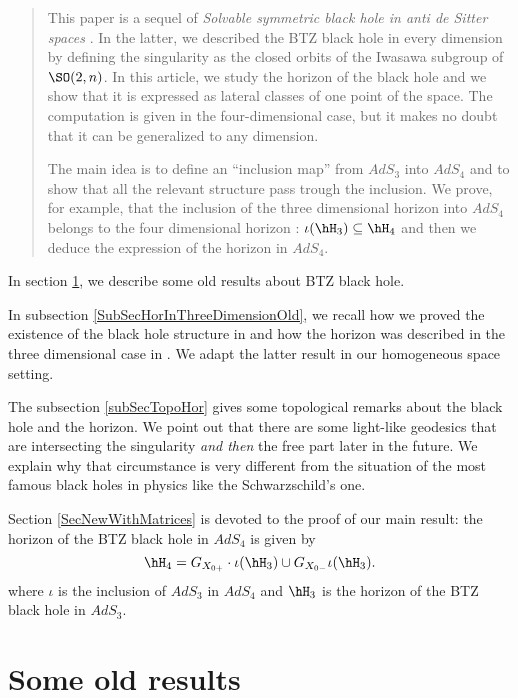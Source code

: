 \begin{abstract}
	This paper is a sequel of \emph{Solvable symmetric black hole in anti de Sitter spaces} \cite{lcTNAdS}. In the latter, we described the BTZ black hole in every dimension by defining the singularity as the closed orbits of the Iwasawa subgroup of $\SO(2,n)$. In this article, we study the horizon of the black hole and we show that it is expressed as lateral classes of one point of the space. The computation is given in the four-dimensional case, but it makes no doubt that it can be generalized to any dimension.

	The main idea is to define an ``inclusion map'' from $AdS_3$ into $AdS_4$ and to show that all the relevant structure pass trough the inclusion. We prove, for example, that the inclusion of the three dimensional horizon into $AdS_4$ belongs to the four dimensional horizon : $\iota(\hH_3)\subseteq\hH_4$ and then we deduce the expression of the horizon in $AdS_4$.
\end{abstract}


In section \ref{SecOldResults}, we describe some old results about BTZ black hole.

In subsection \ref{SubSecHorInThreeDimensionOld}, we recall how we proved the existence of the black hole structure in \cite{lcTNAdS} and how the horizon was described in the three dimensional case in \cite{Keio}. We adapt the latter result in our homogeneous space setting.

The subsection \ref{subSecTopoHor} gives some topological remarks about the black hole and the horizon. We point out that there are some light-like geodesics that are intersecting the singularity \emph{and then} the free part later in the future. We explain why that circumstance is very different from the situation of the most famous black holes in physics like the Schwarzschild's one.

Section \ref{SecNewWithMatrices} is devoted to the proof of our main result: the horizon of the BTZ black hole in $AdS_4$ is given by
\begin{equation}
	\hH_4=G_{X_{0+}}\cdot \iota(\hH_3)\cup G_{X_{0-}}\iota(\hH_3).
\end{equation}
where $\iota$ is the inclusion of $AdS_3$ in $AdS_4$ and $\hH_3$ is the horizon of the BTZ black hole in $AdS_3$.

\section{Some old results}
\label{SecOldResults}

